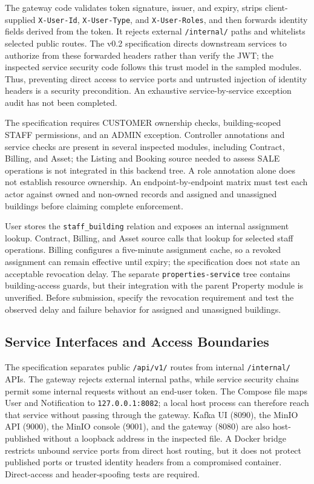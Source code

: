 The gateway code validates token signature, issuer, and expiry, strips client-supplied \texttt{X-User-Id}, \texttt{X-User-Type}, and \texttt{X-User-Roles}, and then forwards identity fields derived from the token. It rejects external \texttt{/internal/} paths and whitelists selected public routes. The v0.2 specification directs downstream services to authorize from these forwarded headers rather than verify the JWT; the inspected service security code follows this trust model in the sampled modules. Thus, preventing direct access to service ports and untrusted injection of identity headers is a security precondition. An exhaustive service-by-service exception audit has not been completed.

The specification requires CUSTOMER ownership checks, building-scoped STAFF permissions, and an ADMIN exception. Controller annotations and service checks are present in several inspected modules, including Contract, Billing, and Asset; the Listing and Booking source needed to assess SALE operations is not integrated in this backend tree. A role annotation alone does not establish resource ownership. An endpoint-by-endpoint matrix must test each actor against owned and non-owned records and assigned and unassigned buildings before claiming complete enforcement.

User stores the \texttt{staff\_building} relation and exposes an internal assignment lookup. Contract, Billing, and Asset source calls that lookup for selected staff operations. Billing configures a five-minute assignment cache, so a revoked assignment can remain effective until expiry; the specification does not state an acceptable revocation delay. The separate \texttt{properties-service} tree contains building-access guards, but their integration with the parent Property module is unverified. Before submission, specify the revocation requirement and test the observed delay and failure behavior for assigned and unassigned buildings.

\subsection{Service Interfaces and Access Boundaries}
The specification separates public \texttt{/api/v1/} routes from internal \texttt{/internal/} APIs. The gateway rejects external internal paths, while service security chains permit some internal requests without an end-user token. The Compose file maps User and Notification to \texttt{127.0.0.1:8082}; a local host process can therefore reach that service without passing through the gateway. Kafka UI (8090), the MinIO API (9000), the MinIO console (9001), and the gateway (8080) are also host-published without a loopback address in the inspected file. A Docker bridge restricts unbound service ports from direct host routing, but it does not protect published ports or trusted identity headers from a compromised container. Direct-access and header-spoofing tests are required.

